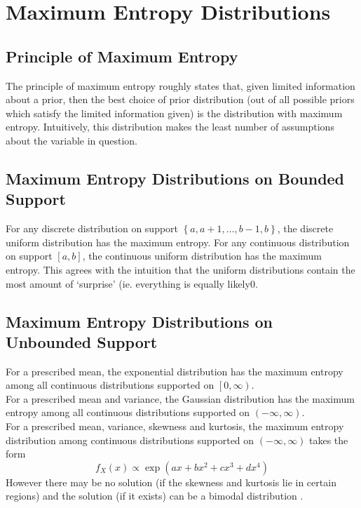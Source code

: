 \documentclass[11pt]{report} %
\begin{document}
\section{Maximum Entropy Distributions}

\subsection{Principle of Maximum Entropy}

The principle of maximum entropy roughly states that, given limited information about a prior, then the best choice of prior distribution (out of all possible priors which satisfy the limited information given) is the distribution with maximum entropy. Intuitively, this distribution makes the least number of assumptions about the variable in question.

\subsection{Maximum Entropy Distributions on Bounded Support}
For any discrete distribution on support $\left\{a, a + 1, \dots, b - 1, b\right\}$, the discrete uniform distribution has the maximum entropy. For any continuous distribution on support $\left[a, b\right]$, the continuous uniform distribution has the maximum entropy. This agrees with the intuition that the uniform distributions contain the most amount of `surprise' (ie. everything is equally likely0.

\subsection{Maximum Entropy Distributions on Unbounded Support}

For a prescribed mean, the exponential distribution has the maximum entropy among all continuous distributions supported on $\left[0, \infty\right)$. \\

For a prescribed mean and variance, the Gaussian distribution has the maximum entropy among all continuous distributions supported on $\left(-\infty, \infty\right)$. \\

For a prescribed mean, variance, skewness and kurtosis, the maximum entropy distribution among continuous distributions supported on $\left(-\infty, \infty\right)$ takes the form
\begin{equation}
f_{X}\left(x\right) \propto \exp\left(ax + bx^{2} + cx^{3} + dx^{4}\right)
\end{equation}
However there may be no solution (if the skewness and kurtosis lie in certain regions) and the solution (if it exists) can be a bimodal distribution \cite{Rockinger2002}.
\end{document}
